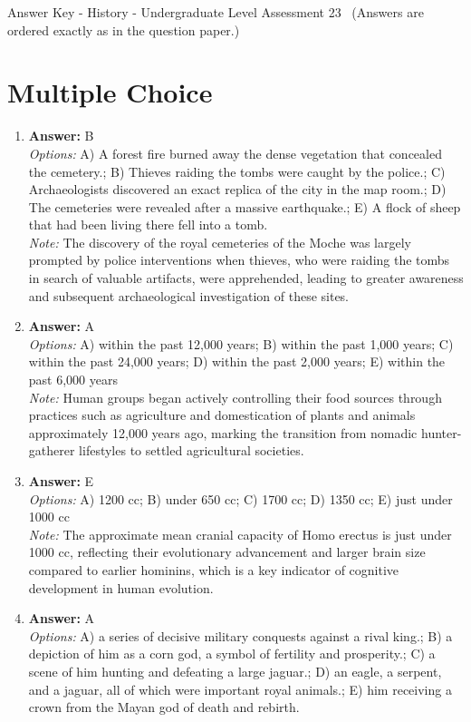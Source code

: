 \documentclass[12pt]{article}
\begin{document}
\begin{center}
Answer Key - History - Undergraduate Level Assessment 23 \
\small (Answers are ordered exactly as in the question paper.)
\end{center}

\section*{Multiple Choice}
\begin{enumerate}[label=\arabic*.]
\item \textbf{Answer:} B
\\ \textit{Options:} A) A forest fire burned away the dense vegetation that concealed the cemetery.; B) Thieves raiding the tombs were caught by the police.; C) Archaeologists discovered an exact replica of the city in the map room.; D) The cemeteries were revealed after a massive earthquake.; E) A flock of sheep that had been living there fell into a tomb.
\\ \textit{Note:} The discovery of the royal cemeteries of the Moche was largely prompted by police interventions when thieves, who were raiding the tombs in search of valuable artifacts, were apprehended, leading to greater awareness and subsequent archaeological investigation of these sites.
\item \textbf{Answer:} A
\\ \textit{Options:} A) within the past 12,000 years; B) within the past 1,000 years; C) within the past 24,000 years; D) within the past 2,000 years; E) within the past 6,000 years
\\ \textit{Note:} Human groups began actively controlling their food sources through practices such as agriculture and domestication of plants and animals approximately 12,000 years ago, marking the transition from nomadic hunter-gatherer lifestyles to settled agricultural societies.
\item \textbf{Answer:} E
\\ \textit{Options:} A) 1200 cc; B) under 650 cc; C) 1700 cc; D) 1350 cc; E) just under 1000 cc
\\ \textit{Note:} The approximate mean cranial capacity of Homo erectus is just under 1000 cc, reflecting their evolutionary advancement and larger brain size compared to earlier hominins, which is a key indicator of cognitive development in human evolution.
\item \textbf{Answer:} A
\\ \textit{Options:} A) a series of decisive military conquests against a rival king.; B) a depiction of him as a corn god, a symbol of fertility and prosperity.; C) a scene of him hunting and defeating a large jaguar.; D) an eagle, a serpent, and a jaguar, all of which were important royal animals.; E) him receiving a crown from the Mayan god of death and rebirth.

\end{enumerate}
\end{document}
